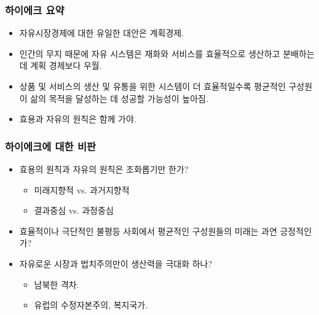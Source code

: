 \documentclass[aspectratio=169,xcolor=dvipsnames,handout]{beamer}
\begin{document}
\begin{frame}[<+->]
\frametitle{하이에크 요약}
    \begin{itemize}
        \item 자유시장경제에 대한 유일한 대안은 계획경제.
        \item 인간의 무지 때문에 자유 시스템은 재화와 서비스를 효율적으로 생산하고 분배하는 데 계획 경제보다 우월.
        \item 상품 및 서비스의 생산 및 유통을 위한 시스템이 더 효율적일수록 평균적인 구성원이 삶의 목적을 달성하는 데 성공할 가능성이 높아짐. 
        \item 효용과 자유의 원칙은 함께 가야.
    \end{itemize}
\end{frame}

\begin{frame}[<+->]
\frametitle{하이에크에 대한 비판}
    \begin{itemize}
        \item 효용의 원칙과 자유의 원칙은 조화롭기만 한가?
        \begin{itemize}
            \item 미래지향적 vs. 과거지향적 
            \item 결과중심 vs. 과정중심
        \end{itemize}
        \item 효율적이나 극단적인 불평등 사회에서 평균적인 구성원들의 미래는 과연 긍정적인가?
        \item 자유로운 시장과 법치주의만이 생산력을 극대화 하나?
        \begin{itemize}
            \item 남북한 격차.
            \item 유럽의 수정자본주의, 복지국가.
        \end{itemize}
    \end{itemize}
\end{frame}
\end{document}

